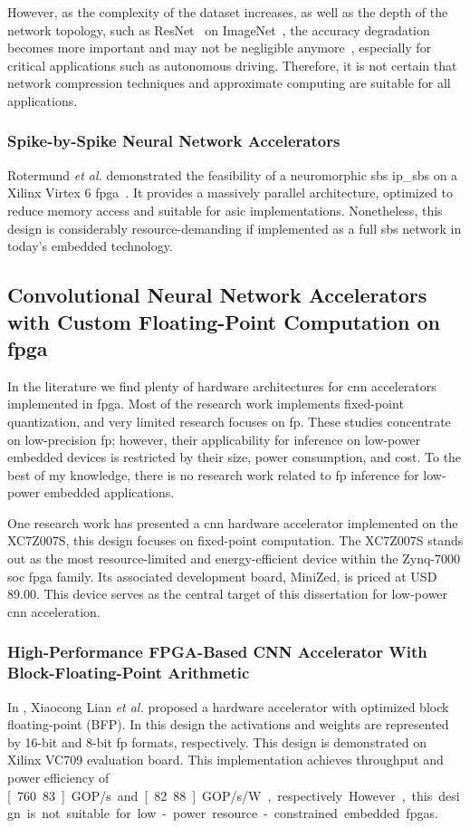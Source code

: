 However, as the complexity of the dataset increases, as well as the depth of the network topology, such as ResNet~\cite{he2016deep} on ImageNet~\cite{russakovsky2015imagenet}, the accuracy degradation becomes more important and may not be negligible anymore~\cite{rastegari2016xnor}, especially for critical applications such as autonomous driving. Therefore, it is not certain that network compression techniques and approximate computing are suitable for all applications.

\subsubsection{Spike-by-Spike Neural Network Accelerators}
Rotermund \textit{et al.} demonstrated the feasibility of a neuromorphic \gls{sbs} \gls{ip_sbs} on a Xilinx Virtex 6 \gls{fpga}~\cite{rotermund2018massively}. It provides a massively parallel architecture, optimized to reduce memory access and suitable for \gls{asic} implementations. Nonetheless, this design is considerably resource-demanding if implemented as a full \gls{sbs} network in today's embedded technology.

\subsection{Convolutional Neural Network Accelerators with Custom Floating-Point Computation on \gls{fpga}
}
\label{sec:related_work}
In the literature we find plenty of hardware architectures for \gls{cnn} accelerators implemented in \gls{fpga}. Most of the research work implements fixed-point quantization, and very limited research focuses on \gls{fp}. These studies concentrate on low-precision \gls{fp}; however, their applicability for inference on low-power embedded devices is restricted by their size, power consumption, and cost. To the best of my knowledge, there is no research work related to \gls{fp} inference for low-power embedded applications.

One research work has presented a \gls{cnn} hardware accelerator implemented on the XC7Z007S, this design focuses on fixed-point computation. The XC7Z007S stands out as the most resource-limited and energy-efficient device within the Zynq-7000 \gls{soc} \gls{fpga} family. Its associated development board, MiniZed, is priced at USD 89.00. This device serves as the central target of this dissertation for low-power \gls{cnn} acceleration.


\subsubsection{High-Performance FPGA-Based CNN Accelerator With Block-Floating-Point Arithmetic}
In \cite{lian2019high}, Xiaocong Lian \textit{et al.} proposed a hardware accelerator with optimized block floating-point (BFP). In this design the activations and weights are represented by 16-bit and 8-bit \gls{fp} formats, respectively. This design is demonstrated on Xilinx VC709 evaluation board. This implementation achieves throughput and power efficiency of \unit[760.83]{GOP/s} and \unit[82.88]{GOP/s/W}, respectively. However, this design is not suitable for low-power resource-constrained embedded \glspl{fpga}.

